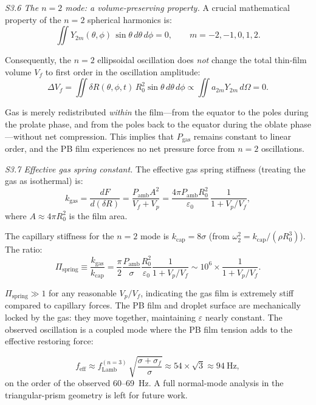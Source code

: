\documentclass[%
 preprint,
 superscriptaddress,
 amsmath,amssymb,
 aps, prl,
]{revtex4-2}
\begin{document}
{\noindent\textit{S3.6 The $n=2$ mode: a volume-preserving property.}}
A crucial mathematical property of the $n=2$ spherical harmonics is:
\begin{equation}
\iint Y_{2m}(\theta,\phi)\,\sin\theta\,d\theta\,d\phi = 0,
\qquad m = -2,-1,0,1,2.
\label{eq:s3_orthogonality}
\end{equation}

Consequently, the $n=2$ ellipsoidal oscillation does \textit{not} change the total thin-film volume $V_f$ to first order in the oscillation amplitude:
\begin{equation}
\Delta V_f = \iint \delta R(\theta,\phi,t)\,R_0^2\sin\theta\,d\theta\,d\phi
\propto \iint a_{2m}Y_{2m}\,d\Omega = 0.
\label{eq:s3_vol_change}
\end{equation}

Gas is merely redistributed \textit{within} the film---from the equator to the poles during the prolate phase, and from the poles back to the equator during the oblate phase---without net compression. This implies that $P_{\text{gas}}$ remains constant to linear order, and the PB film experiences no net pressure force from $n=2$ oscillations.\par

{\noindent\textit{S3.7 Effective gas spring constant.}}
The effective gas spring stiffness (treating the gas as isothermal) is:
\begin{equation}
k_{\text{gas}} = \frac{dF}{d(\delta R)} = \frac{P_{\text{amb}} A^2}{V_f + V_p}
= \frac{4\pi P_{\text{amb}} R_0^2}{\varepsilon_0}\,
\frac{1}{1 + V_p/V_f},
\label{eq:s3_kgas}
\end{equation}
where $A \approx 4\pi R_0^2$ is the film area.\par

The capillary stiffness for the $n=2$ mode is $k_{\text{cap}} = 8\sigma$ (from $\omega_2^2 = k_{\text{cap}}/(\rho R_0^3)$). The ratio:
\begin{equation}
\Pi_{\text{spring}} \equiv \frac{k_{\text{gas}}}{k_{\text{cap}}}
= \frac{\pi}{2}\frac{P_{\text{amb}}}{\sigma}
\frac{R_0^2}{\varepsilon_0}\frac{1}{1 + V_p/V_f}
\sim 10^6 \times \frac{1}{1 + V_p/V_f}.
\label{eq:s3_spring_ratio}
\end{equation}

$\Pi_{\text{spring}} \gg 1$ for any reasonable $V_p/V_f$, indicating the gas film is extremely stiff compared to capillary forces. The PB film and droplet surface are mechanically locked by the gas: they move together, maintaining $\varepsilon$ nearly constant. The observed oscillation is a coupled mode where the PB film tension adds to the effective restoring force:\par
\begin{equation}
f_{\text{eff}} \approx f_{\text{Lamb}}^{(n=3)}\,
\sqrt{\frac{\sigma + \sigma_f}{\sigma}}
\approx 54 \times \sqrt{3} \approx 94~\text{Hz},
\end{equation}
on the order of the observed 60--69~Hz. A full normal-mode analysis in the triangular-prism geometry is left for future work.\par
\end{document}

